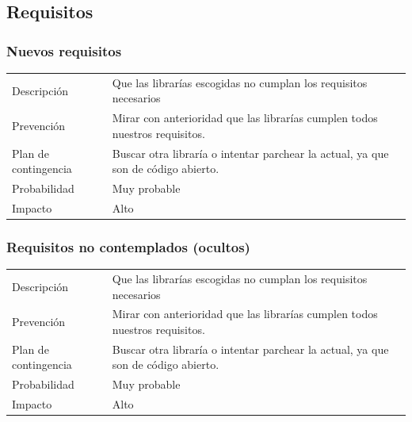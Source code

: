 \subsection{Requisitos}
\subsubsection{Nuevos requisitos}
\begin{table}[h]
    \begin{center}
        \begin{tabular}{l p{8cm}}
            Descripci\'{o}n                 & Que las librar\'{i}as escogidas no cumplan los requisitos necesarios \\
            Prevenci\'{o}n                  & Mirar con anterioridad que las librar\'{i}as cumplen todos nuestros requisitos. \\ 
            Plan de contingencia            & Buscar otra librar\'{i}a o intentar parchear la actual, ya que son de c\'{o}digo abierto. \\
            Probabilidad                    & Muy probable \\
            Impacto                         & Alto \\
        \end{tabular}
    \end{center}
    
\end{table}

\subsubsection{Requisitos no contemplados (ocultos)}
\begin{table}[h]
    \begin{center}
        \begin{tabular}{l p{8cm}}
            Descripci\'{o}n                 & Que las librar\'{i}as escogidas no cumplan los requisitos necesarios \\
            Prevenci\'{o}n                  & Mirar con anterioridad que las librar\'{i}as cumplen todos nuestros requisitos. \\ 
            Plan de contingencia            & Buscar otra librar\'{i}a o intentar parchear la actual, ya que son de c\'{o}digo abierto. \\
            Probabilidad                    & Muy probable \\
            Impacto                         & Alto \\
        \end{tabular}
    \end{center}
    
\end{table}

